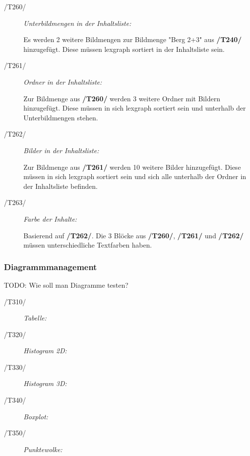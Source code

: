 \begin{description}
			\item[/T260/] \textit{Unterbildmengen in der Inhaltsliste:}\par Es werden 2 weitere Bildmengen zur Bildmenge "Berg 2+3" aus \textbf{/T240/} hinzugefügt. Diese müssen \gls{lexgraph} sortiert in der Inhaltsliste sein.
			\item[/T261/] \textit{Ordner in der Inhaltsliste:}\par Zur Bildmenge aus \textbf{/T260/} werden 3 weitere Ordner mit Bildern hinzugefügt. Diese müssen in sich \gls{lexgraph} sortiert sein und unterhalb der Unterbildmengen stehen.
			\item[/T262/] \textit{Bilder in der Inhaltsliste:}\par Zur Bildmenge aus \textbf{/T261/} werden 10 weitere Bilder hinzugefügt. Diese müssen in sich \gls{lexgraph} sortiert sein und sich alle unterhalb der Ordner in der Inhaltsliste befinden.
			\item[/T263/] \textit{Farbe der Inhalte:}\par Basierend auf \textbf{/T262/}. Die 3 Blöcke aus \textbf{/T260/}, \textbf{/T261/} und \textbf{/T262/} müssen unterschiedliche Textfarben haben. 
		
		\end{description}
	
	\subsubsection{Diagrammmanagement}

		TODO: Wie soll man Diagramme testen?	
	
		\begin{description}
			
			\item[/T310/] \textit{Tabelle:}\par 

			\item[/T320/] \textit{Histogram 2D:}\par 
		
			\item[/T330/] \textit{Histogram 3D:}\par 

			\item[/T340/] \textit{Boxplot:}\par 

			\item[/T350/] \textit{Punktewolke:}\par 
			

			
		\end{description}
	
